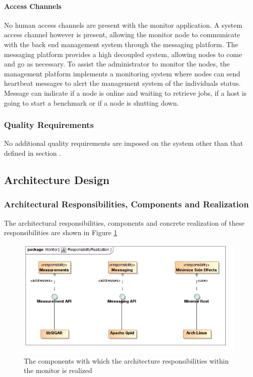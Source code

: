 \paragraph*{Access Channels}
No human access channels are present with the monitor application. A system
access channel however is present, allowing the monitor node to communicate with
the back end management system through the messaging platform. The messaging
platform provides a high decoupled system, allowing nodes to come and go as
necessary. To assist the administrator to monitor the nodes, the management
platform implements a monitoring system where nodes can send heartbeat messages
to alert the management system of the individuals status. Message can indicate
if a node is online and waiting to retrieve jobs, if a host is going to start a
benchmark or if a node is shutting down.

\subsubsection{Quality Requirements}
No additional quality requirements are imposed on the system other than that
defined in section \label{sec:overallQualityRequirement}.

\subsection{Architecture Design}
\subsubsection{Architectural Responsibilities, Components and Realization}
The architectural responsibilities, components and concrete realization of these 
responsibilities are shown in 
Figure \ref{fig:databaseResponsibilityRealization}
\begin{figure}[H]
	\begin{center}
	\includegraphics[scale=0.5]{../Diagrams and Charts/Monitor/ResponsibilityRealization.jpg}
	\caption{The components with which the architecture responsibilities within the monitor is realized}
	\label{fig:databaseResponsibilityRealization}
	\end{center}
\end{figure}

